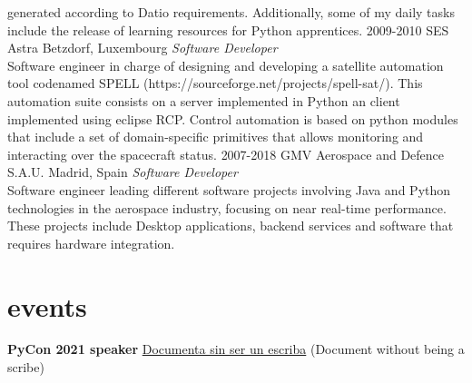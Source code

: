 \documentclass[]{friggeri-cv}
\begin{document}
\begin{entrylist}
{generated according to Datio requirements. Additionally, some of my daily tasks include the release of learning resources for Python apprentices.}
\entry
{2009-2010}
{SES Astra}
{Betzdorf, Luxembourg}
{\emph{Software Developer} \\
Software engineer in charge of designing and developing a satellite automation tool codenamed SPELL (https://sourceforge.net/projects/spell-sat/).
This automation suite consists on a server implemented in Python an client implemented using eclipse RCP.
Control automation is based on python modules that include a set of domain-specific primitives that allows monitoring and interacting over the
spacecraft status.}
\entry
{2007-2018}
{GMV Aerospace and Defence S.A.U.}
{Madrid, Spain}
{\emph{Software Developer} \\
Software engineer leading different software projects involving Java and Python technologies in the aerospace industry, focusing on near real-time performance.
These projects include Desktop applications, backend services and software that requires hardware integration.}
\end{entrylist}


\section{events}

\textbf{\headingfont PyCon 2021 speaker} \href{https://www.youtube.com/watch?v=U8SP_Osd8ZY}{Documenta sin ser un escriba} (Document without being a scribe)
 
\end{document}
